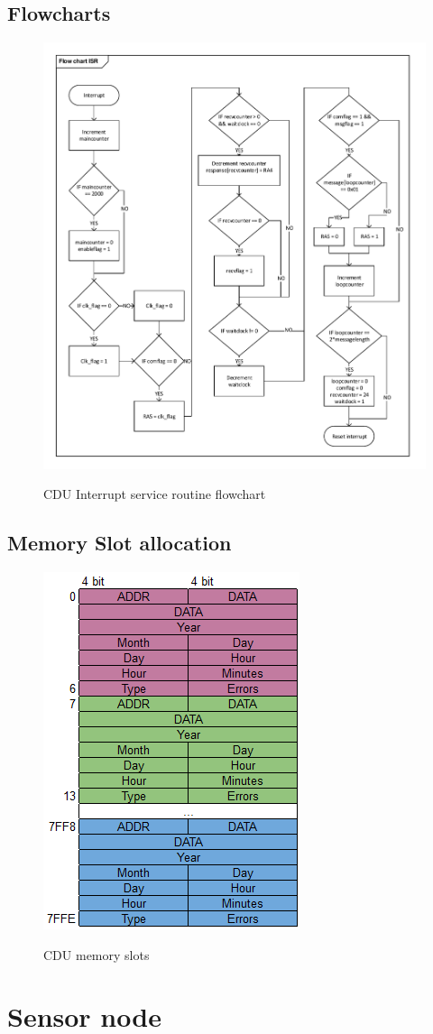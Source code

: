 \subsection{Flowcharts}
\begin{figure}[H]
\centering
\includegraphics[width=1\textwidth]{billeder/isrflowchart}
\label{fig:isrflowchart}
\caption{CDU Interrupt service routine flowchart}
\end{figure}

\subsection{Memory Slot allocation}
\begin{figure}[H]
\centering
\includegraphics[scale=1]{billeder/memoryslots}
\label{fig:memoryslots}
\caption{CDU memory slots}
\end{figure}

\section{Sensor node}
